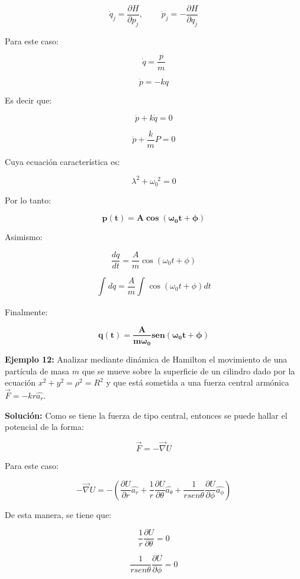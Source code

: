 \documentclass[]{article}
\begin{document}
\[{\dot{q}}_{j} = \frac{\partial H}{\partial p_{j}},\ \ \ \ \ \ \ \ \ \ {\dot{p}}_{j} = - \frac{\partial H}{\partial q_{j}}\]

Para este caso:

\[\dot{q} = \frac{p}{m}\]

\[\dot{p} = - kq\]

Es decir que:

\[\ddot{p} + k\dot{q} = 0\]

\[\ddot{p} + \frac{k}{m}P = 0\]

Cuya ecuación característica es:

\[\lambda^{2} + \omega_{0}^{\ \ 2} = 0\]

Por lo tanto:

\[\mathbf{p}\left( \mathbf{t} \right)\mathbf{= A}\mathbf{\cos}\left( \mathbf{\omega}_{\mathbf{0}}\mathbf{t + \phi} \right)\]

Asimismo:

\[\frac{dq}{dt} = \frac{A}{m}\cos\left( \omega_{0}t + \phi \right)\]

\[\int_{}^{}{dq} = \frac{A}{m}\int_{}^{}{\cos\left( \omega_{0}t + \phi \right)}dt\]

Finalmente:

\[\mathbf{q}\left( \mathbf{t} \right)\mathbf{=}\frac{\mathbf{A}}{\mathbf{m}\mathbf{\omega}_{\mathbf{0}}}\mathbf{sen}\left( \mathbf{\omega}_{\mathbf{0}}\mathbf{t + \phi} \right)\]

\textbf{Ejemplo 12:} Analizar mediante dinámica de Hamilton el
movimiento de una partícula de masa \(m\) que se mueve sobre la
superficie de un cilindro dado por la ecuación
\(x^{2} + y^{2} = \rho^{2} = R^{2}\) y que está sometida a una fuerza
central armónica \(\overrightarrow{F} = - kr\widehat{a_{r}}\).

\textbf{Solución:} Como se tiene la fuerza de tipo central, entonces se
puede hallar el potencial de la forma:

\[\overrightarrow{F} = - \overrightarrow{\nabla}U\]

Para este caso:

\[- \overrightarrow{\nabla}U = - \left( \frac{\partial U}{\partial r}\widehat{a_{r}} + \frac{1}{r}\frac{\partial U}{\partial\theta}\widehat{a_{\theta}} + \frac{1}{r{sen}\theta}\frac{\partial U}{\partial\phi}\widehat{a_{\phi}} \right)\]

De esta manera, se tiene que:

\[\frac{1}{r}\frac{\partial U}{\partial\theta} = 0\]

\[\frac{1}{r{sen}\theta}\frac{\partial U}{\partial\phi} = 0\]
\end{document}
